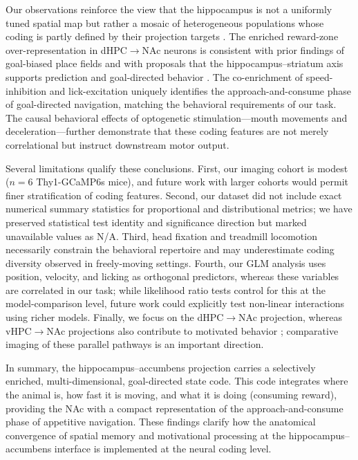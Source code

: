 \documentclass[11pt]{article}
\begin{document}
Our observations reinforce the view that the hippocampus is not a uniformly tuned spatial map but rather a mosaic of heterogeneous populations whose coding is partly defined by their projection targets \citep{ciocchi2015selective,xu2016ventral,danielson2016sublayer,turi2019vasopressinergic}. The enriched reward-zone over-representation in dHPC$\to$NAc neurons is consistent with prior findings of goal-biased place fields \citep{hollup2001accumulation,dupret2010reactivation,gauthier2018dedicated} and with proposals that the hippocampus--striatum axis supports prediction and goal-directed behavior \citep{pennartz2011ventral,vandermeer2010integrating,sosa2021dorsal}. The co-enrichment of speed-inhibition and lick-excitation uniquely identifies the approach-and-consume phase of goal-directed navigation, matching the behavioral requirements of our task. The causal behavioral effects of optogenetic stimulation---mouth movements and deceleration---further demonstrate that these coding features are not merely correlational but instruct downstream motor output.

Several limitations qualify these conclusions. First, our imaging cohort is modest ($n=6$ Thy1-GCaMP6s mice), and future work with larger cohorts would permit finer stratification of coding features. Second, our dataset did not include exact numerical summary statistics for proportional and distributional metrics; we have preserved statistical test identity and significance direction but marked unavailable values as N/A. Third, head fixation and treadmill locomotion necessarily constrain the behavioral repertoire and may underestimate coding diversity observed in freely-moving settings. Fourth, our GLM analysis uses position, velocity, and licking as orthogonal predictors, whereas these variables are correlated in our task; while likelihood ratio tests control for this at the model-comparison level, future work could explicitly test non-linear interactions using richer models. Finally, we focus on the dHPC$\to$NAc projection, whereas vHPC$\to$NAc projections also contribute to motivated behavior \citep{ciocchi2015selective,britt2012synaptic,legates2018distinct}; comparative imaging of these parallel pathways is an important direction.

In summary, the hippocampus--accumbens projection carries a selectively enriched, multi-dimensional, goal-directed state code. This code integrates where the animal is, how fast it is moving, and what it is doing (consuming reward), providing the NAc with a compact representation of the approach-and-consume phase of appetitive navigation. These findings clarify how the anatomical convergence of spatial memory and motivational processing at the hippocampus--accumbens interface is implemented at the neural coding level.
\end{document}
